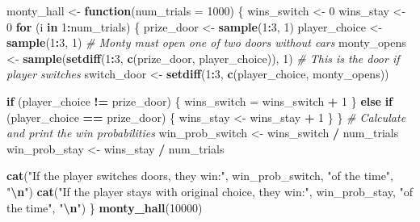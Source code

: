 \documentclass[
]{book}
\newenvironment{Shaded}{\begin{snugshade}}{\end{snugshade}}
\newcommand{\AttributeTok}[1]{\textcolor[rgb]{0.13,0.29,0.53}{#1}}
\newcommand{\CommentTok}[1]{\textcolor[rgb]{0.56,0.35,0.01}{\textit{#1}}}
\newcommand{\ControlFlowTok}[1]{\textcolor[rgb]{0.13,0.29,0.53}{\textbf{#1}}}
\newcommand{\DecValTok}[1]{\textcolor[rgb]{0.00,0.00,0.81}{#1}}
\newcommand{\FunctionTok}[1]{\textcolor[rgb]{0.13,0.29,0.53}{\textbf{#1}}}
\newcommand{\NormalTok}[1]{#1}
\newcommand{\OtherTok}[1]{\textcolor[rgb]{0.56,0.35,0.01}{#1}}
\newcommand{\SpecialCharTok}[1]{\textcolor[rgb]{0.81,0.36,0.00}{\textbf{#1}}}
\newcommand{\StringTok}[1]{\textcolor[rgb]{0.31,0.60,0.02}{#1}}
\begin{document}
\begin{Shaded}
\begin{Highlighting}[]
\NormalTok{monty\_hall }\OtherTok{\textless{}{-}} \ControlFlowTok{function}\NormalTok{(}\AttributeTok{num\_trials =} \DecValTok{1000}\NormalTok{) \{}
\NormalTok{  wins\_switch }\OtherTok{\textless{}{-}} \DecValTok{0}
\NormalTok{  wins\_stay   }\OtherTok{\textless{}{-}} \DecValTok{0}
  \ControlFlowTok{for}\NormalTok{ (i }\ControlFlowTok{in} \DecValTok{1}\SpecialCharTok{:}\NormalTok{num\_trials) \{}
\NormalTok{    prize\_door    }\OtherTok{\textless{}{-}} \FunctionTok{sample}\NormalTok{(}\DecValTok{1}\SpecialCharTok{:}\DecValTok{3}\NormalTok{, }\DecValTok{1}\NormalTok{)}
\NormalTok{    player\_choice }\OtherTok{\textless{}{-}} \FunctionTok{sample}\NormalTok{(}\DecValTok{1}\SpecialCharTok{:}\DecValTok{3}\NormalTok{, }\DecValTok{1}\NormalTok{)}
    \CommentTok{\# Monty must open one of two doors without cars}
\NormalTok{    monty\_opens }\OtherTok{\textless{}{-}} \FunctionTok{sample}\NormalTok{(}\FunctionTok{setdiff}\NormalTok{(}\DecValTok{1}\SpecialCharTok{:}\DecValTok{3}\NormalTok{, }\FunctionTok{c}\NormalTok{(prize\_door, player\_choice)), }\DecValTok{1}\NormalTok{)}
    \CommentTok{\# This is the door if player switches}
\NormalTok{    switch\_door }\OtherTok{\textless{}{-}} \FunctionTok{setdiff}\NormalTok{(}\DecValTok{1}\SpecialCharTok{:}\DecValTok{3}\NormalTok{, }\FunctionTok{c}\NormalTok{(player\_choice, monty\_opens))}

    \ControlFlowTok{if}\NormalTok{ (player\_choice }\SpecialCharTok{!=}\NormalTok{ prize\_door) \{}
\NormalTok{      wins\_switch }\OtherTok{=}\NormalTok{ wins\_switch }\SpecialCharTok{+} \DecValTok{1}
\NormalTok{    \} }\ControlFlowTok{else} \ControlFlowTok{if}\NormalTok{ (player\_choice }\SpecialCharTok{==}\NormalTok{ prize\_door) \{}
\NormalTok{      wins\_stay }\OtherTok{\textless{}{-}}\NormalTok{ wins\_stay }\SpecialCharTok{+} \DecValTok{1}
\NormalTok{    \}}
\NormalTok{  \}}
  \CommentTok{\# Calculate and print the win probabilities}
\NormalTok{  win\_prob\_switch }\OtherTok{\textless{}{-}}\NormalTok{ wins\_switch }\SpecialCharTok{/}\NormalTok{ num\_trials}
\NormalTok{  win\_prob\_stay }\OtherTok{\textless{}{-}}\NormalTok{ wins\_stay }\SpecialCharTok{/}\NormalTok{ num\_trials}
  
  \FunctionTok{cat}\NormalTok{(}\StringTok{"If the player switches doors, they win:"}\NormalTok{, win\_prob\_switch, }\StringTok{"of the time"}\NormalTok{, }\StringTok{"}\SpecialCharTok{\textbackslash{}n}\StringTok{"}\NormalTok{)}
  \FunctionTok{cat}\NormalTok{(}\StringTok{"If the player stays with original choice, they win:"}\NormalTok{, win\_prob\_stay, }\StringTok{"of the time"}\NormalTok{, }\StringTok{"}\SpecialCharTok{\textbackslash{}n}\StringTok{"}\NormalTok{)}
\NormalTok{\}}
\FunctionTok{monty\_hall}\NormalTok{(}\DecValTok{10000}\NormalTok{)}
\end{Highlighting}
\end{Shaded}
\end{document}
